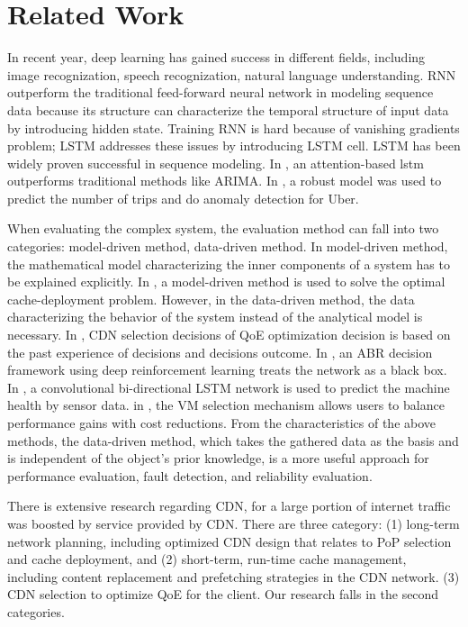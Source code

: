 \documentclass[5p]{elsarticle}
\begin{document}
\section{Related Work}
In recent year, deep learning has gained success in different fields, including image recognization, speech recognization, natural language understanding\cite{Lecun2015}. RNN\cite{Schmidhuber1989} outperform the traditional feed-forward neural network in modeling sequence data because its structure can characterize the temporal structure of input data by introducing hidden state. Training RNN is hard because of vanishing gradients problem; LSTM addresses these issues by introducing LSTM cell\cite{Hochreiter1997LongMemory}. LSTM has been widely proven successful in sequence modeling. In \cite{Qin}, an attention-based lstm outperforms traditional methods like ARIMA. In \cite{Zhu2017DeepUber}, a robust model was used to predict the number of trips and do anomaly detection for Uber. 

When evaluating the complex system, the evaluation method can fall into two categories: model-driven method, data-driven method. In model-driven method, the mathematical model characterizing the inner components of a system has to be explained explicitly. In \cite{Tang2017RethinkingDemands}, a model-driven method is used to solve the optimal cache-deployment problem. However, in the data-driven method, the data characterizing the behavior of the system instead of the analytical model is necessary. In \cite{Jiang2017Pytheas:Exploration-Exploitation}, CDN selection decisions of QoE optimization decision is based on the past experience of decisions and decisions outcome. In \cite{Mao2017NeuralPensieve}, an ABR decision framework using deep reinforcement learning treats the network as a black box. In \cite{Zhao2017LearningNetworks}, a convolutional bi-directional LSTM network is used to predict the machine health by sensor data. in \cite{Yadwadkar2017SelectingClouds}, the VM selection mechanism allows users to balance performance gains with cost reductions. From the characteristics of the above methods, the data-driven method, which takes the gathered data as the basis and is independent of the object’s prior knowledge, is a more useful approach for performance evaluation, fault detection, and reliability evaluation.

There is extensive research regarding CDN, for a large portion of internet traffic was boosted by service provided by CDN. There are three category: (1) long-term network planning, including optimized CDN design that relates to PoP selection and cache deployment\cite{Krishnan2000}\cite{Hasan2014}\cite{Tang2017RethinkingDemands}, and (2) short-term, run-time cache management, including content replacement and prefetching strategies in the CDN network\cite{Borst2010}\cite{Leconte2016}\cite{Applegate2016}. (3) CDN selection to optimize QoE for the client\cite{Jiang2017Pytheas:Exploration-Exploitation}\cite{JiangCFA:Optimization}. Our research falls in the second categories.
\end{document}
